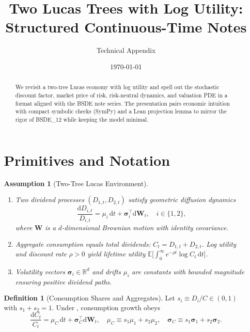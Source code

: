 \documentclass[11pt,letterpaper]{article}
\title{Two Lucas Trees with Log Utility: Structured Continuous-Time Notes}
\author{Technical Appendix}
\date{\today}
\theoremstyle{plain}
\newtheorem{assumptionT}{Assumption}
\theoremstyle{definition}
\newtheorem{definitionT}{Definition}
\newenvironment{assumption}[2]{\begin{assumptionT}[#1]\label{ass:#2}}{\end{assumptionT}}
\newenvironment{definition}[2]{\begin{definitionT}[#1]\label{def:#2}}{\end{definitionT}}
\newcommand{\E}{\mathbb{E}}
\newcommand{\R}{\mathbb{R}}
\newcommand{\diff}{\mathrm{d}}
\begin{document}
\maketitle

\begin{abstract}
We revisit a two-tree Lucas economy with log utility and spell out the stochastic discount factor, market price of risk, risk-neutral dynamics, and valuation PDE in a format aligned with the BSDE note series. The presentation pairs economic intuition with compact symbolic checks (SymPy) and a Lean projection lemma to mirror the rigor of BSDE\_12 while keeping the model minimal.
\end{abstract}

\section{Primitives and Notation}\label{sec:primitives}
\begin{assumption}{Two-Tree Lucas Environment}{lucas}
\begin{enumerate}[leftmargin=1.25em]
  \item Two dividend processes $(D_{1,t},D_{2,t})$ satisfy geometric diffusion dynamics
  \begin{equation}\label{eq:dividend}
    \frac{\diff D_{i,t}}{D_{i,t}} = \mu_i\, \diff t + \bm{\sigma}_i^{\top} \diff \bm{W}_t,
    \quad i \in \{1,2\},
  \end{equation}
  where $\bm{W}$ is a $d$-dimensional Brownian motion with identity covariance.
  \item Aggregate consumption equals total dividends: $C_t = D_{1,t} + D_{2,t}$. Log utility and discount rate $\rho>0$ yield lifetime utility $\E\big[ \int_0^{\infty} e^{-\rho t} \log C_t\, \diff t \big]$.
  \item Volatility vectors $\bm{\sigma}_i \in \R^d$ and drifts $\mu_i$ are constants with bounded magnitude ensuring positive dividend paths.
\end{enumerate}
\end{assumption}

\begin{definition}{Consumption Shares and Aggregates}{shares}
Let $s_i \equiv D_i / C \in (0,1)$ with $s_1+s_2=1$. Under , consumption growth obeys
\begin{equation}\label{eq:consumption}
  \frac{\diff C_t}{C_t} = \mu_C\,\diff t + \bm{\sigma}_C^{\top} \diff \bm{W}_t,
  \quad \mu_C \equiv s_1 \mu_1 + s_2 \mu_2,
  \quad \bm{\sigma}_C \equiv s_1 \bm{\sigma}_1 + s_2 \bm{\sigma}_2.
\end{equation}
\end{definition}
\end{document}

